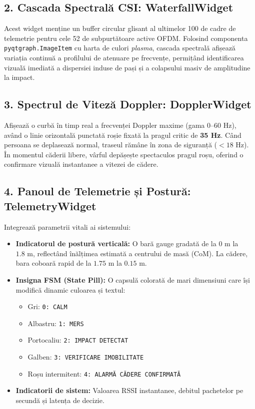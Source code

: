 \subsection{2. Cascada Spectrală CSI: WaterfallWidget}
Acest widget menține un buffer circular glisant al ultimelor 100 de cadre de telemetrie pentru cele 52 de subpurtătoare active OFDM. Folosind componenta \texttt{pyqtgraph.ImageItem} cu harta de culori \textit{plasma}, cascada spectrală afișează variația continuă a profilului de atenuare pe frecvențe, permițând identificarea vizuală imediată a dispersiei induse de pași și a colapsului masiv de amplitudine la impact.

\subsection{3. Spectrul de Viteză Doppler: DopplerWidget}
Afișează o curbă în timp real a frecvenței Doppler maxime (gama 0--60 Hz), având o linie orizontală punctată roșie fixată la pragul critic de \textbf{35 Hz}. Când persoana se deplasează normal, traseul rămâne în zona de siguranță ($<18\text{ Hz}$). În momentul căderii libere, vârful depășește spectaculos pragul roșu, oferind o confirmare vizuală instantanee a vitezei de cădere.

\subsection{4. Panoul de Telemetrie și Postură: TelemetryWidget}
Integrează parametrii vitali ai sistemului:
\begin{itemize}
    \item \textbf{Indicatorul de postură verticală:} O bară gauge gradată de la $0\text{ m}$ la $1.8\text{ m}$, reflectând înălțimea estimată a centrului de masă (CoM). La cădere, bara coboară rapid de la $1.75\text{ m}$ la $0.15\text{ m}$.
    \item \textbf{Insigna FSM (State Pill):} O capsulă colorată de mari dimensiuni care își modifică dinamic culoarea și textul:
    \begin{itemize}
        \item Gri: \texttt{0: CALM}
        \item Albastru: \texttt{1: MERS}
        \item Portocaliu: \texttt{2: IMPACT DETECTAT}
        \item Galben: \texttt{3: VERIFICARE IMOBILITATE}
        \item Roșu intermitent: \texttt{4: ALARMĂ CĂDERE CONFIRMATĂ}
    \end{itemize}
    \item \textbf{Indicatorii de sistem:} Valoarea RSSI instantanee, debitul pachetelor pe secundă și latența de decizie.
\end{itemize}

